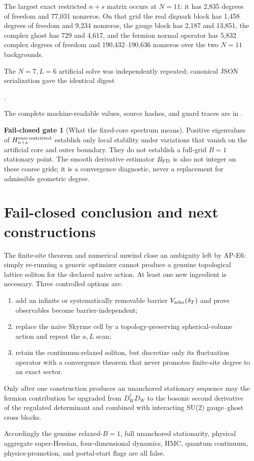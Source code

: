 \documentclass[11pt]{article}
\theoremstyle{definition}
\newtheorem{gate}[theorem]{Fail-closed gate}
\theoremstyle{remark}
\begin{document}
The largest exact restricted $n+s$ matrix occurs at $N=11$: it has 2,835
degrees of freedom and 77,031 nonzeros. On that grid the real diquark block
has 1,458 degrees of freedom and 9,234 nonzeros, the gauge block has 2,187 and
13,851, the complex ghost has 729 and 4,617, and the fermion normal operator
has 5,832 complex degrees of freedom and 190,432--190,636 nonzeros over the
two $N=11$ backgrounds.

The $N=7,L=6$ artificial solve was independently repeated; canonical JSON
serialization gave the identical digest
\begin{center}
.
\end{center}
The complete machine-readable values, source hashes, and guard traces are in
.

\begin{gate}[What the fixed-core spectrum means]
Positive eigenvalues of $H_{n+s}^{\rm core\,restricted}$ establish only local
stability under variations that vanish on the artificial core and outer
boundary. They do not establish a full-grid $B=1$ stationary point. The smooth
derivative estimator $B_{\rm FD}$ is also not integer on these coarse grids;
it is a convergence diagnostic, never a replacement for admissible geometric
degree.
\end{gate}

\section{Fail-closed conclusion and next constructions}

The finite-site theorem and numerical unwind close an ambiguity left by
AP-E6: simply re-running a generic optimizer cannot produce a genuine
topological lattice soliton for the declared naive action. At least one new
ingredient is necessary. Three controlled options are:
\begin{enumerate}
\item add an infinite or systematically removable barrier
  $V_{\rm adm}(\delta_T)$ and prove observables become barrier-independent;
\item replace the naive Skyrme cell by a topology-preserving spherical-volume
  action and repeat the $a,L$ scan;
\item retain the continuum-relaxed soliton, but discretize only its fluctuation
  operator with a convergence theorem that never promotes finite-site degree
  to an exact sector.
\end{enumerate}
Only after one construction produces an unanchored stationary sequence may
the fermion contribution be upgraded from $D_W^\dagger D_W$ to the bosonic
second derivative of the regulated determinant and combined with interacting
SU(2) gauge--ghost cross blocks.

Accordingly the genuine relaxed-$B=1$, full unanchored stationarity, physical
aggregate super-Hessian, four-dimensional dynamics, HMC, quantum continuum,
physics-promotion, and portal-start flags are all false.



\end{document}
